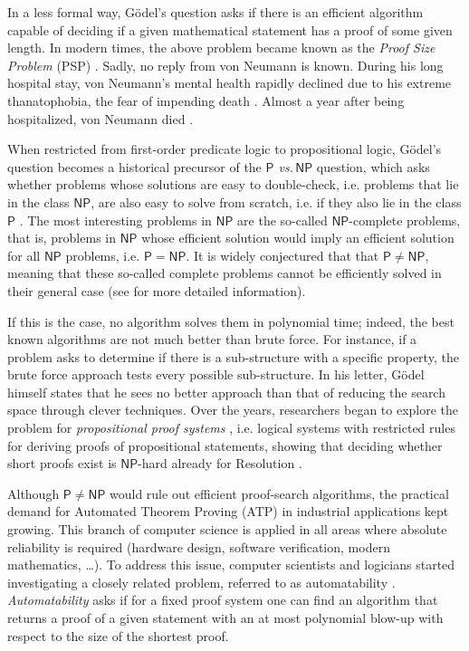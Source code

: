 In a less formal way, Gödel's question asks if there is an efficient algorithm capable of deciding if a given mathematical statement has a proof of some given length. In modern times, the above problem became known as the \textit{Proof Size Problem} (PSP) \cite{psp_res, psp_res_2, pap}. Sadly, no reply from von Neumann is known. During his long hospital stay, von Neumann's mental health rapidly declined due to his extreme thanatophobia, the fear of impending death \cite{vn_biography}. Almost a year after being hospitalized, von Neumann died \cite{vn_book, vn_biography}.

When restricted from first-order predicate logic to propositional logic, Gödel's question becomes a historical precursor of the \textit{$\mathsf{P}$ vs.\,$\mathsf{NP}$} question, which asks whether problems whose solutions are easy to double-check, i.e. problems that lie in the class $\mathsf{NP}$, are also easy to solve from scratch, i.e. if they also lie in the class $\mathsf{P}$ \cite{cook_sat, levin_fsat}. The most interesting problems in $\mathsf{NP}$ are the so-called $\mathsf{NP}$-complete problems, that is, problems in $\mathsf{NP}$ whose efficient solution would imply an efficient solution for all $\mathsf{NP}$ problems, i.e. $\mathsf{P} = \mathsf{NP}$. It is widely conjectured that that $\mathsf{P} \neq \mathsf{NP}$, meaning that these so-called complete problems cannot be efficiently solved in their general case (see  for more detailed information).

If this is the case, no algorithm solves them in polynomial time; indeed, the best known algorithms are not much better than brute force. For instance, if a problem asks to determine if there is a sub-structure with a specific property, the brute force approach tests every possible sub-structure. In his letter, Gödel himself states that he sees no better approach than that of reducing the search space through clever techniques. Over the years, researchers began to explore the problem for \textit{propositional proof systems} \cite{cook_proof_compx, kraj_book, galesi_toran}, i.e. logical systems with restricted rules for deriving proofs of propositional statements, showing that deciding whether short proofs exist is $\mathsf{NP}$-hard already for Resolution \cite{psp_res, psp_res_2}.

Although $\mathsf{P} \neq \mathsf{NP}$ would rule out efficient proof-search algorithms, the practical demand for Automated Theorem Proving (ATP) \cite{handbook_sat} in industrial applications kept growing. This branch of computer science is applied in all areas where absolute reliability is required (hardware design, software verification, modern mathematics, \dots). To address this issue, computer scientists and logicians started investigating a closely related problem, referred to as automatability \cite{no_fis_int}. \textit{Automatability} asks if for a fixed proof system one can find an algorithm that returns a proof of a given statement with an at most polynomial blow-up with respect to the size of the shortest proof.

